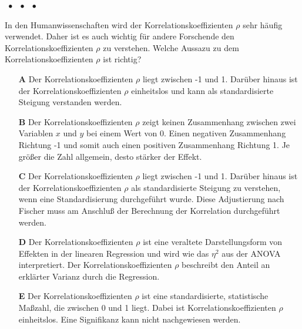 \documentclass[a4paper, 9pt]{scrartcl}\usepackage[]{graphicx}\usepackage[]{xcolor}
\begin{document}
\ifcollection
\begin{flushright}
\tiny\vspace{-2Ex}
\textbf{\examinhaltstart}
\exammodulestat $\;\bullet$
\exammodulestatbbv $\;\bullet$
\exammodulestatversuch $\;\bullet$
\exammodulebiostat
\vspace{-1Ex}
\end{flushright}
\fi




In den Humanwissenschaften wird der Korrelationskoeffizienten $\rho$ sehr häufig verwendet. Daher ist es auch wichtig für andere Forschende den Korrelationskoeffizienten $\rho$ zu verstehen. Welche Aussazu zu dem Korrelationskoeffizienten $\rho$ ist richtig?




\begin{enumerate}
\item [\textbf{A} \msquare] Der Korrelationskoeffizienten $\rho$ liegt zwischen -1 und 1. Darüber hinaus ist der Korrelationskoeffizienten $\rho$ einheitslos und kann als standardisierte Steigung verstanden werden.
\item [\textbf{B} \msquare] Der Korrelationskoeffizienten $\rho$ zeigt keinen Zusammenhang zwischen zwei Variablen $x$ und $y$ bei einem Wert von 0. Einen negativen Zusammenhang Richtung -1 und somit auch einen positiven Zusammenhang Richtung 1. Je größer die Zahl allgemein, desto stärker der Effekt.
\item [\textbf{C} \msquare] Der Korrelationskoeffizienten $\rho$ liegt zwischen -1 und 1. Darüber hinaus ist der Korrelationskoeffizienten $\rho$ als standardisierte Steigung zu verstehen, wenn eine Standardisierung durchgeführt wurde. Diese Adjustierung nach Fischer muss am Anschluß der Berechnung der Korrelation durchgeführt werden.
\item [\textbf{D} \msquare] Der Korrelationskoeffizienten $\rho$ ist eine veraltete Darstellungsform von Effekten in der linearen Regression und wird wie das $\eta^2$ aus der ANOVA interpretiert. Der Korrelationskoeffizienten $\rho$ beschreibt den Anteil an erklärter Varianz durch die Regression.
\item [\textbf{E} \msquare] Der Korrelationskoeffizienten $\rho$ ist eine standardisierte, statistische Maßzahl, die zwischen 0 und 1 liegt. Dabei ist Korrelationskoeffizienten $\rho$ einheitslos. Eine Signifikanz kann nicht nachgewiesen werden.
\end{enumerate}
\end{document}
